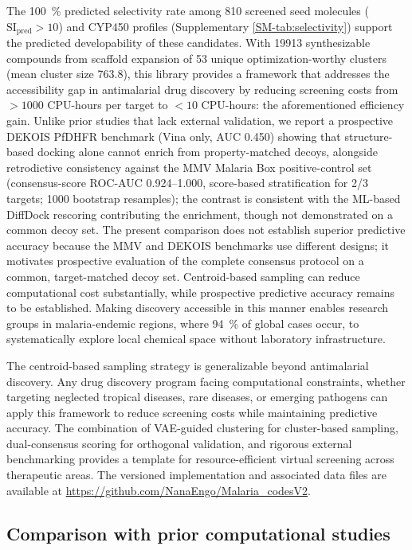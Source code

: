 \documentclass[journal=jcisd8,manuscript=article]{achemso}
\begin{document}
The \qty{100}{\percent} predicted selectivity rate among \num{810} screened seed molecules ($\text{SI}_{\text{pred}} > \num{10}$) and CYP450 profiles
(Supplementary \cref{SM-tab:selectivity}) support the predicted developability of these candidates. With \num{19913} synthesizable compounds from scaffold
expansion of \num{53} unique optimization-worthy clusters (mean cluster size \num{763.8}), this library provides a framework that addresses the accessibility
gap in antimalarial drug discovery by reducing screening costs from $>\num{1000}$ CPU-hours per target to $<\num{10}$ CPU-hours: the aforementioned efficiency
gain. Unlike prior studies that lack external validation, we report a prospective DEKOIS PfDHFR benchmark (Vina only, AUC \num{0.450}) showing that
structure-based docking alone cannot enrich from property-matched decoys, alongside retrodictive consistency against the MMV Malaria Box positive-control set
(consensus-score ROC-AUC \numrange{0.924}{1.000}, score-based stratification for 2/3 targets; \num{1000} bootstrap resamples); the contrast is consistent with
the ML-based DiffDock rescoring contributing the enrichment, though not demonstrated on a common decoy set. The present comparison does not establish superior predictive accuracy because the MMV and DEKOIS benchmarks use different designs; it motivates prospective evaluation of the complete consensus protocol on a common, target-matched decoy set. Centroid-based sampling
can reduce computational cost substantially, while prospective predictive accuracy remains to be established. Making discovery accessible in this manner enables research groups in
malaria-endemic regions, where \qty{94}{\percent} of global cases occur, to systematically explore local chemical space without laboratory infrastructure.

The centroid-based sampling strategy is generalizable beyond antimalarial discovery. Any drug discovery program facing computational constraints, whether
targeting neglected tropical diseases, rare diseases, or emerging pathogens can apply this framework to reduce screening costs while maintaining predictive
accuracy. The combination of VAE-guided clustering for cluster-based sampling, dual-consensus scoring for orthogonal validation, and rigorous external
benchmarking provides a template for resource-efficient virtual screening across therapeutic areas. The versioned implementation and associated data files are available at \url{https://github.com/NanaEngo/Malaria_codesV2}.

\subsection*{Comparison with prior computational studies}
\end{document}

